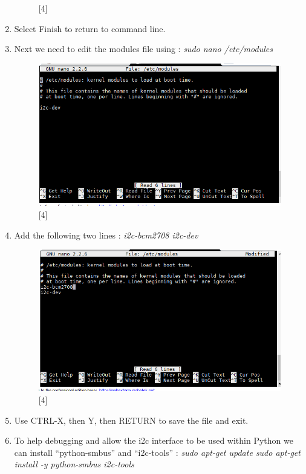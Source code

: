 \documentclass[11pt,a4paper]{article}
\begin{document}
\begin{enumerate}
\begin{figure}[h!]
			\centering
			\caption{[4]}
		\end{figure}
		\item Select Finish to return to command line.
		\item Next we need to edit the modules file using : \newline \textit{sudo nano /etc/modules} 
		\begin{figure}[h!]
			\includegraphics[scale=0.6]{i2c_7.png}
			\centering
			\caption{[4]}
		\end{figure}
		\item Add the following two lines : \newline \textit{i2c-bcm2708 \newline i2c-dev}
		\begin{figure}[h!]
			\includegraphics[scale=0.6]{i2c_8.png}
			\centering
			\caption{[4]}
		\end{figure}
		\item Use CTRL-X, then Y, then RETURN to save the file and exit.
		\item To help debugging and allow the i2c interface to be used within Python we can install “python-smbus” and “i2c-tools” : \newline \textit{sudo apt-get update \newline sudo apt-get install -y python-smbus i2c-tools}

\end{enumerate}
\end{document}
